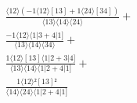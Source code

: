 \documentclass[varwidth, border=5pt]{standalone}
\begin{document}
\begin{my}
$\begin{gathered}
\scriptscriptstyle\frac{⟨12⟩(-1⟨12⟩[13]+1⟨24⟩[34])}{⟨13⟩⟨14⟩⟨24⟩} +\\
\scriptscriptstyle\frac{-1⟨12⟩⟨1|3+4|1]}{⟨13⟩⟨14⟩⟨34⟩} +\\
\scriptscriptstyle\frac{1⟨12⟩[13]⟨1|2+3|4]}{⟨13⟩⟨14⟩⟨1|2+4|1]} +\\
\scriptscriptstyle\frac{1⟨12⟩²[13]²}{⟨14⟩⟨24⟩⟨1|2+4|1]} \phantom{+}
\end{gathered}$
\end{my}
\end{document}
